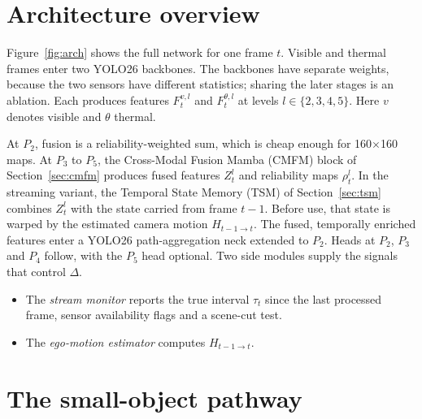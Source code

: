 \section{Architecture overview}
\label{sec:arch}

Figure~\ref{fig:arch} shows the full network for one frame $t$. Visible and
thermal frames enter two YOLO26 backbones. The backbones have separate
weights, because the two sensors have different statistics; sharing the
later stages is an ablation. Each produces features
$F^{v,l}_t$ and $F^{\theta,l}_t$ at levels $l\in\{2,3,4,5\}$. Here $v$ denotes
visible and $\theta$ thermal.

At $P_2$, fusion is a reliability-weighted sum, which is cheap enough for
160$\times$160 maps. At $P_3$ to $P_5$, the Cross-Modal Fusion Mamba (CMFM)
block of Section~\ref{sec:cmfm} produces fused features $Z^l_t$ and
reliability maps $\rho^l_t$. In the streaming variant, the Temporal State
Memory (TSM) of Section~\ref{sec:tsm} combines $Z^l_t$ with the state carried
from frame $t-1$. Before use, that state is warped by the estimated camera
motion $H_{t-1\to t}$. The fused, temporally enriched features enter a
YOLO26 path-aggregation neck extended to $P_2$. Heads at $P_2$, $P_3$ and
$P_4$ follow, with the $P_5$ head optional. Two side modules supply the
signals that control $\Delta$.
\begin{itemize}
  \item The \emph{stream monitor} reports the true interval $\tau_t$ since
        the last processed frame, sensor availability flags and a scene-cut
        test.
  \item The \emph{ego-motion estimator} computes $H_{t-1\to t}$.
\end{itemize}



\section{The small-object pathway}
\label{sec:smallpath}

